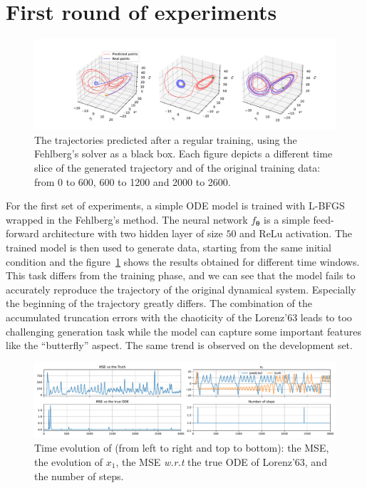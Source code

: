 \documentclass{article}
\newcommand{\params}{\ensuremath{\boldsymbol{\theta}}}
\newcommand{\nnet}{\ensuremath{f_{\params}}}
\begin{document}
\section{First round of experiments}
\label{sec:first-exp}

\begin{figure}[thb]
  \hspace*{-2cm}
  \includegraphics[width=1.2\textwidth]{./figs/baseline_lorenz_3}
  \caption{The trajectories predicted after a regular training, using
    the Fehlberg's solver as a black box. Each figure depicts a
    different time slice of the generated trajectory and of the
    original training data: from 0 to 600, 600 to 1200 and 2000 to 2600. }
  \label{fig:baseline_lorenz}
\end{figure}


For the first set of experiments, a simple ODE model is trained with
L-BFGS~\cite{Liu89LBFGS} wrapped in the Fehlberg's method. The neural
network $\nnet$ is a simple feed-forward architecture with two hidden
layer of size $50$ and ReLu activation. The trained model is then used
to generate data, starting from the same initial condition and the
figure~\ref{fig:baseline_lorenz} shows the results obtained for
different time windows. This task differs from the training phase, and
we can see that the model fails to accurately reproduce the trajectory
of the original dynamical system. Especially the beginning of the
trajectory greatly differs. The combination of the accumulated
truncation errors with the chaoticity of the Lorenz'63 leads to too
challenging generation task while the model can capture some important
features like the ``butterfly'' aspect. The same trend is observed on
the development set.


\begin{figure}[thb]
  \centering
  \includegraphics[width=1\textwidth]{./figs/baseline_time_series_2x2}
  \caption{Time evolution of (from left to right and top to bottom):
    the MSE, the evolution of $x_1$, the MSE \textit{w.r.t} the true ODE of
    Lorenz'63, and  the number of
    steps.}
  \label{fig:baseline_series}
\end{figure}
\end{document}
